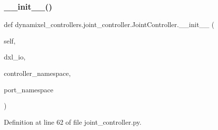 \subsubsection{\texorpdfstring{\+\_\+\+\_\+init\+\_\+\+\_\+()}{\_\_init\_\_()}}
{\footnotesize\ttfamily def dynamixel\+\_\+controllers.\+joint\+\_\+controller.\+Joint\+Controller.\+\_\+\+\_\+init\+\_\+\+\_\+ (\begin{DoxyParamCaption}\item[{}]{self,  }\item[{}]{dxl\+\_\+io,  }\item[{}]{controller\+\_\+namespace,  }\item[{}]{port\+\_\+namespace }\end{DoxyParamCaption})}



Definition at line 62 of file joint\+\_\+controller.\+py.


